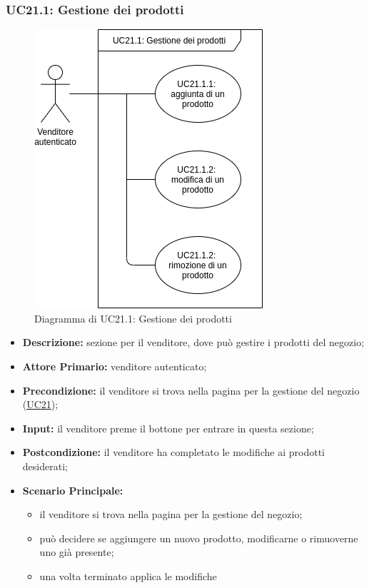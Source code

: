         \subsubsection{UC21.1: Gestione dei prodotti}
        \label{sec:UC21.1}
        \begin{figure}[!ht]
            \caption{Diagramma di UC21.1: Gestione dei prodotti}
            \vspace{10px}
            \includegraphics[scale=0.5]{../../../Images/AnalisiRequisiti/UC21.1}
            \centering
        \end{figure}
        \begin{itemize}
            \item \textbf{Descrizione:} sezione per il venditore, dove può gestire i prodotti del negozio;
            \item \textbf{Attore Primario:} venditore autenticato;
            \item \textbf{Precondizione:} il venditore si trova nella pagina per la gestione del negozio (\hyperref[sec:UC21]{\underline{UC21}});
            \item \textbf{Input:} il venditore preme il bottone per entrare in questa sezione;
            \item \textbf{Postcondizione:} il venditore ha completato le modifiche ai prodotti desiderati;
            \item \textbf{Scenario Principale:} 
                \begin{itemize}
                    \item il venditore si trova nella pagina per la gestione del negozio;
                    \item può decidere se aggiungere un nuovo prodotto, modificarne o rimuoverne uno già presente;
                    \item una volta terminato applica le modifiche
                \end{itemize}
        \end{itemize}
